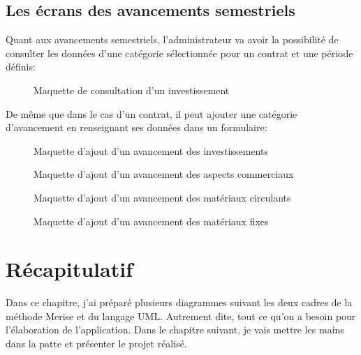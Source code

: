	\subsection{Les écrans des avancements semestriels}

	Quant aux avancements semestriels, l'administrateur va avoir la possibilité
	de consulter les données d'une catégorie sélectionnée pour un contrat et une période définis:
	\begin{figure}[H]
		\begin{center}
			\caption{Maquette de consultation d'un investissement}
		\end{center}
	\end{figure}

	De même que dans le cas d'un contrat, il peut ajouter une catégorie d'avancement en renseignant ses données dans un formulaire:
	\begin{figure}[H]
		\begin{center}
			\caption{Maquette d'ajout d'un avancement des investissements}
		\end{center}
	\end{figure}

	\begin{figure}[H]
		\begin{center}
			\caption{Maquette d'ajout d'un avancement des aspects commerciaux}
		\end{center}
	\end{figure}

	\begin{figure}[H]
		\begin{center}
			\caption{Maquette d'ajout d'un avancement des matériaux circulants}
		\end{center}
	\end{figure}

	\begin{figure}[H]
		\begin{center}
			\caption{Maquette d'ajout d'un avancement des matériaux fixes}
		\end{center}
	\end{figure}

	\section{Récapitulatif}

	Dans ce chapitre, j'ai préparé plusieurs diagrammes suivant les deux cadres de la méthode Merise et du langage UML.
	Autrement dite, tout ce qu’on a besoin pour l'élaboration de l’application. Dans le chapitre suivant,
	je vais mettre les mains dans la patte et présenter le projet réalisé.
